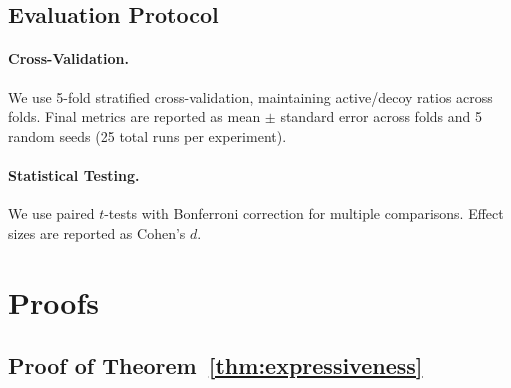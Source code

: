\documentclass{article}
\begin{document}
\subsection{Evaluation Protocol}

\paragraph{Cross-Validation.} We use 5-fold stratified cross-validation, maintaining active/decoy ratios across folds. Final metrics are reported as mean $\pm$ standard error across folds and 5 random seeds (25 total runs per experiment).

\paragraph{Statistical Testing.} We use paired $t$-tests with Bonferroni correction for multiple comparisons. Effect sizes are reported as Cohen's $d$.

\section{Proofs}
\label{app:proofs}

\subsection{Proof of Theorem~\ref{thm:expressiveness}}
\end{document}
